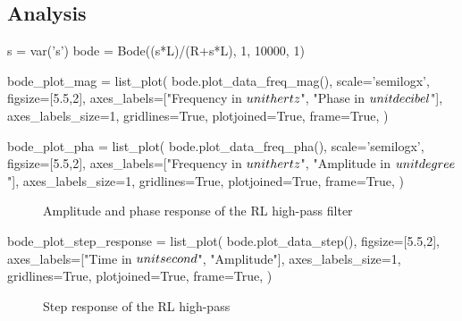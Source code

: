 \subsection{Analysis}

\begin{sagesilent}
    s = var('s')
    bode = Bode((s*L)/(R+s*L), 1, 10000, 1)

    bode_plot_mag = list_plot(
        bode.plot_data_freq_mag(),
        scale='semilogx',
        figsize=[5.5,2],
        axes_labels=["Frequency in $\\unit{\\hertz}$", "Phase in $\\unit{\\decibel}$"],
        axes_labels_size=1,
        gridlines=True,
        plotjoined=True,
        frame=True,
    )

    bode_plot_pha = list_plot(
        bode.plot_data_freq_pha(),
        scale='semilogx',
        figsize=[5.5,2],
        axes_labels=["Frequency in $\\unit{\\hertz}$", "Amplitude in $\\unit{\\degree}$"],
        axes_labels_size=1,
        gridlines=True,
        plotjoined=True,
        frame=True,
    )
\end{sagesilent}

\begin{figure}[H]
    \centering
    \begin{subfigure}{\textwidth}
        \centering
    \end{subfigure}
    \quad
    \begin{subfigure}{\textwidth}
        \centering
    \end{subfigure}
    \caption{Amplitude and phase response of the RL high-pass filter}
\end{figure}

\begin{sagesilent}
    bode_plot_step_response = list_plot(
        bode.plot_data_step(),
        figsize=[5.5,2],
        axes_labels=["Time in $\\unit{\\second}$", "Amplitude"],
        axes_labels_size=1,
        gridlines=True,
        plotjoined=True,
        frame=True,
    )
\end{sagesilent}

\begin{figure}[H]
    \centering
    \caption{Step response of the RL high-pass}
\end{figure}

